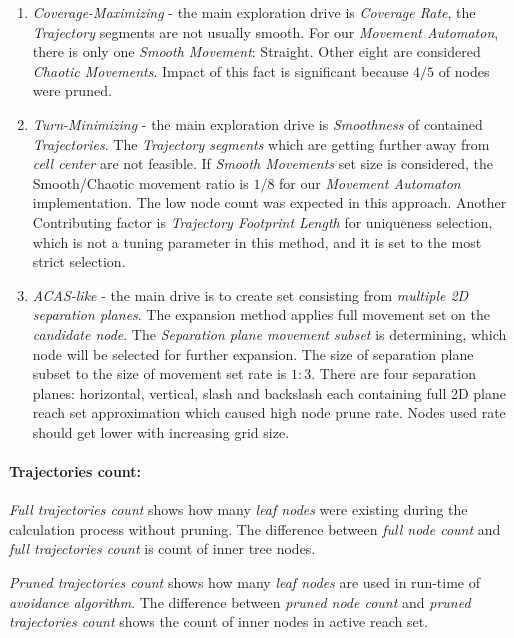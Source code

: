\begin{enumerate}
    \item \emph{Coverage-Maximizing} - the main exploration drive  is \emph{Coverage Rate}, the \emph{Trajectory} segments are not usually smooth. For our \emph{Movement Automaton}, there is only one \emph{Smooth Movement}: Straight. Other eight are considered \emph{Chaotic Movements}. Impact of this fact is significant because $4/5$ of nodes were pruned.
    
    \item \emph{Turn-Minimizing} - the main exploration drive is \emph{Smoothness} of contained \emph{Trajectories}. The \emph{Trajectory segments} which are getting further away from \emph{cell center} are not feasible. If \emph{Smooth Movements} set size is considered, the Smooth/Chaotic movement ratio is $1/8$ for our \emph{Movement Automaton} implementation. The low node count was expected in this approach. Another Contributing factor is \emph{Trajectory Footprint Length} for uniqueness selection, which is not a tuning parameter in this method, and it is set to the most strict selection.
    
    \item \emph{ACAS-like} - the main drive is to create set consisting from \emph{multiple 2D separation planes}. The expansion method applies full movement set on the \emph{candidate node}. The \emph{Separation plane movement subset} is determining, which node will be selected for further expansion. The size of separation plane subset to the size of movement set rate is $1:3$. There are four separation planes: horizontal, vertical, slash and backslash each containing full 2D plane reach set approximation which caused high node prune rate. Nodes used rate should get lower with increasing grid size.
    
\end{enumerate}

\paragraph{Trajectories count:} \emph{Full trajectories count} shows how many \emph{leaf nodes} were existing during the calculation process without pruning. The difference between \emph{full node count} and \emph{full trajectories count} is count of inner tree nodes. 

\emph{Pruned trajectories count} shows how many \emph{leaf nodes} are used in run-time of \emph{avoidance algorithm}. The difference between \emph{pruned node count} and \emph{pruned trajectories count} shows the count of inner nodes in active reach set.

